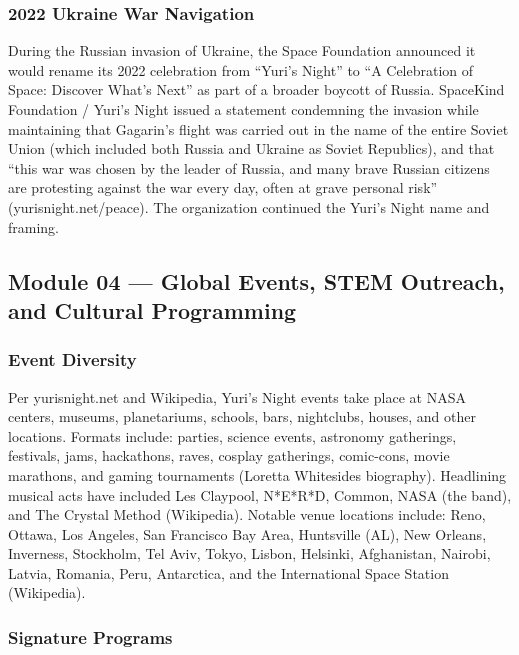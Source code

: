 \documentclass[11pt,letterpaper]{article}
\begin{document}
\subsubsection{2022 Ukraine War Navigation}

During the Russian invasion of Ukraine, the Space Foundation announced it would rename its 2022 celebration from ``Yuri's Night'' to ``A Celebration of Space: Discover What's Next'' as part of a broader boycott of Russia. SpaceKind Foundation / Yuri's Night issued a statement condemning the invasion while maintaining that Gagarin's flight was carried out in the name of the entire Soviet Union (which included both Russia and Ukraine as Soviet Republics), and that ``this war was chosen by the leader of Russia, and many brave Russian citizens are protesting against the war every day, often at grave personal risk'' (yurisnight.net/peace). The organization continued the Yuri's Night name and framing.

\subsection{Module 04 — Global Events, STEM Outreach, and Cultural Programming}

\subsubsection{Event Diversity}

Per yurisnight.net and Wikipedia, Yuri's Night events take place at NASA centers, museums, planetariums, schools, bars, nightclubs, houses, and other locations. Formats include: parties, science events, astronomy gatherings, festivals, jams, hackathons, raves, cosplay gatherings, comic-cons, movie marathons, and gaming tournaments (Loretta Whitesides biography). Headlining musical acts have included Les Claypool, N*E*R*D, Common, NASA (the band), and The Crystal Method (Wikipedia). Notable venue locations include: Reno, Ottawa, Los Angeles, San Francisco Bay Area, Huntsville (AL), New Orleans, Inverness, Stockholm, Tel Aviv, Tokyo, Lisbon, Helsinki, Afghanistan, Nairobi, Latvia, Romania, Peru, Antarctica, and the International Space Station (Wikipedia).

\subsubsection{Signature Programs}
\end{document}
